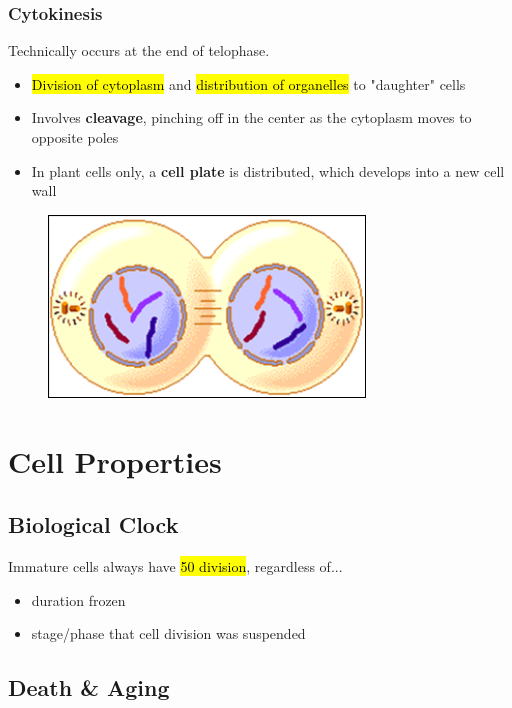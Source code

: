 \documentclass[a4paper,12pt]{article}
\begin{document}
\subsubsection{Cytokinesis}
Technically occurs at the end of telophase.
\begin{itemize}
    \item{\hl{Division of cytoplasm} and \hl{distribution of organelles} to "daughter" cells}
    \item{Involves \textbf{cleavage}, pinching off in the center as the cytoplasm moves to opposite poles}
    \item{In plant cells only, a \textbf{cell plate} is distributed, which develops into a new cell wall}
\end{itemize}

\begin{figure}[H]
    \centering
    \includegraphics[width=0.75\textwidth]{telophase}
\end{figure}

\section{Cell Properties}

\subsection{Biological Clock}\noindent

Immature cells always have \hl{50 division}, regardless of...
\begin{itemize}
    \item{duration frozen}
    \item{stage/phase that cell division was suspended}
\end{itemize}

\subsection{Death \& Aging}\noindent
\end{document}
